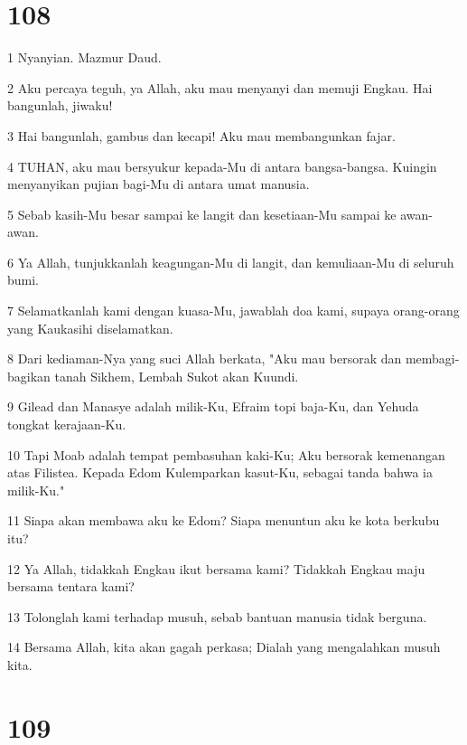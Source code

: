 \chapter{108}

\par 1 Nyanyian. Mazmur Daud.
\par 2 Aku percaya teguh, ya Allah, aku mau menyanyi dan memuji Engkau. Hai bangunlah, jiwaku!
\par 3 Hai bangunlah, gambus dan kecapi! Aku mau membangunkan fajar.
\par 4 TUHAN, aku mau bersyukur kepada-Mu di antara bangsa-bangsa. Kuingin menyanyikan pujian bagi-Mu di antara umat manusia.
\par 5 Sebab kasih-Mu besar sampai ke langit dan kesetiaan-Mu sampai ke awan-awan.
\par 6 Ya Allah, tunjukkanlah keagungan-Mu di langit, dan kemuliaan-Mu di seluruh bumi.
\par 7 Selamatkanlah kami dengan kuasa-Mu, jawablah doa kami, supaya orang-orang yang Kaukasihi diselamatkan.
\par 8 Dari kediaman-Nya yang suci Allah berkata, "Aku mau bersorak dan membagi-bagikan tanah Sikhem, Lembah Sukot akan Kuundi.
\par 9 Gilead dan Manasye adalah milik-Ku, Efraim topi baja-Ku, dan Yehuda tongkat kerajaan-Ku.
\par 10 Tapi Moab adalah tempat pembasuhan kaki-Ku; Aku bersorak kemenangan atas Filistea. Kepada Edom Kulemparkan kasut-Ku, sebagai tanda bahwa ia milik-Ku."
\par 11 Siapa akan membawa aku ke Edom? Siapa menuntun aku ke kota berkubu itu?
\par 12 Ya Allah, tidakkah Engkau ikut bersama kami? Tidakkah Engkau maju bersama tentara kami?
\par 13 Tolonglah kami terhadap musuh, sebab bantuan manusia tidak berguna.
\par 14 Bersama Allah, kita akan gagah perkasa; Dialah yang mengalahkan musuh kita.

\chapter{109}

